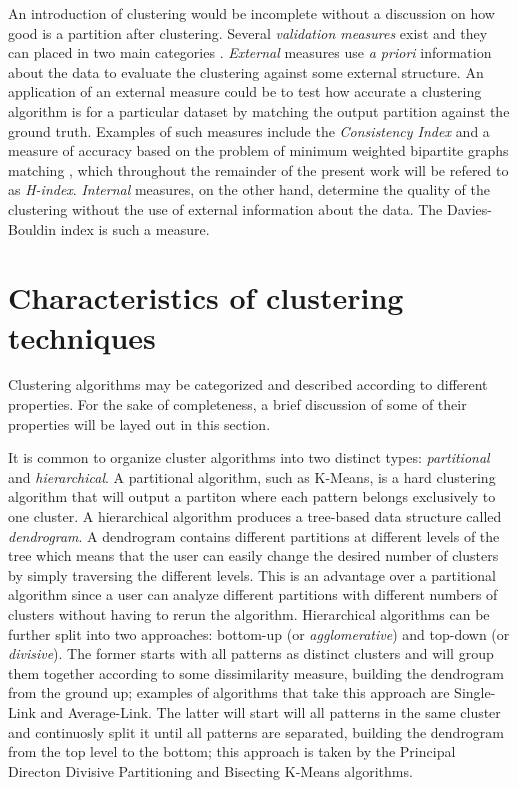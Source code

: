 An introduction of clustering would be incomplete without a discussion on how good is a partition after clustering.
Several \emph{validation measures} exist and they can placed in two main categories \cite{Aggarwal2014}.
\emph{External} measures use \emph{a priori} information about the data to evaluate the clustering against some external structure.
An application of an external measure could be to test how accurate a clustering algorithm is for a particular dataset by matching the output partition against the ground truth.
Examples of such measures include the \emph{Consistency Index} \cite{Fred2001} and a measure of accuracy based on the problem of minimum weighted bipartite graphs matching \cite{lange2004stability}, which throughout the remainder of the present work will be refered to as \emph{H-index}.
\emph{Internal} measures, on the other hand, determine the quality of the clustering without the use of external information about the data.
The Davies-Bouldin index \cite{davies1979cluster} is such a measure.



\section{Characteristics of clustering techniques}
\label{sec:clustering properties}

Clustering algorithms may be categorized and described according to different properties.
For the sake of completeness, a brief discussion of some of their properties will be layed out in this section.

It is common to organize cluster algorithms into two distinct types: \emph{partitional} and \emph{hierarchical}.
A partitional algorithm, such as K-Means, is a hard clustering algorithm that will output a partiton where each pattern belongs exclusively to one cluster.
A hierarchical algorithm produces a tree-based data structure called \emph{dendrogram}.
A dendrogram contains different partitions at different levels of the tree which means that the user can easily change the desired number of clusters by simply traversing the different levels.
This is an advantage over a partitional algorithm since a user can analyze different partitions with different numbers of clusters without having to rerun the algorithm.
Hierarchical algorithms can be further split into two approaches: bottom-up (or \emph{agglomerative}) and top-down (or \emph{divisive}).
The former starts with all patterns as distinct clusters and will group them together according to some dissimilarity measure, building the dendrogram from the ground up; examples of algorithms that take this approach are Single-Link and Average-Link.
The latter will start will all patterns in the same cluster and continuosly split it until all patterns are separated, building the dendrogram from the top level to the bottom; this approach is taken by the Principal Directon Divisive Partitioning\cite{Boley1998} and Bisecting K-Means \cite{Steinbach2000} algorithms.


